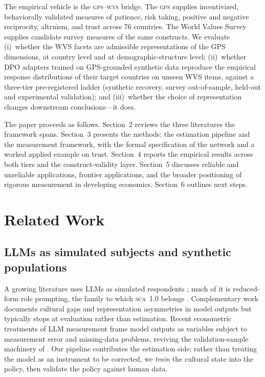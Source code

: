 \documentclass[11pt,letterpaper]{article}
\newcommand{\GPS}{\textsc{gps}}
\newcommand{\WVS}{\textsc{wvs}}
\newcommand{\SCA}{\textsc{sca}}
\begin{document}
The empirical vehicle is the \GPS{}--\WVS{} bridge. The \GPS{} \cite{falk2018} supplies incentivized, behaviorally validated measures of patience, risk taking, positive and negative reciprocity, altruism, and trust across 76 countries. The World Values Survey supplies candidate survey measures of the same constructs. We evaluate (i)~whether the WVS facets are admissible representations of the GPS dimensions, at country level and at demographic-structure level; (ii)~whether DPO adapters trained on GPS-grounded synthetic data reproduce the empirical response distributions of their target countries on unseen WVS items, against a three-tier pre-registered ladder (synthetic recovery, survey out-of-sample, held-out and experimental validation); and (iii)~whether the choice of representation changes downstream conclusions---it does.

The paper proceeds as follows. Section~2 reviews the three literatures the framework spans. Section~3 presents the methods: the estimation pipeline and the measurement framework, with the formal specification of the network and a worked applied example on trust. Section~4 reports the empirical results across both tiers and the construct-validity layer. Section~5 discusses reliable and unreliable applications, frontier applications, and the broader positioning of rigorous measurement in developing economics. Section~6 outlines next steps.

\section{Related Work}

\subsection{LLMs as simulated subjects and synthetic populations}

A growing literature uses LLMs as simulated respondents \cite{horton2023,achar2023,argyle2023}; much of it is reduced-form role prompting, the family to which \SCA{}~1.0 belongs \cite{capra2025}. Complementary work documents cultural gaps and representation asymmetries in model outputs \cite{cao2023,durmus2024} but typically stops at evaluation rather than estimation. Recent econometric treatments of LLM measurement \cite{ludwig2026,carlsondell2025} frame model outputs as variables subject to measurement error and missing-data problems, reviving the validation-sample machinery of \cite{bound1991}. Our pipeline contributes the estimation side: rather than treating the model as an instrument to be corrected, we \emph{train} the cultural state into the policy, then validate the policy against human data.
\end{document}
